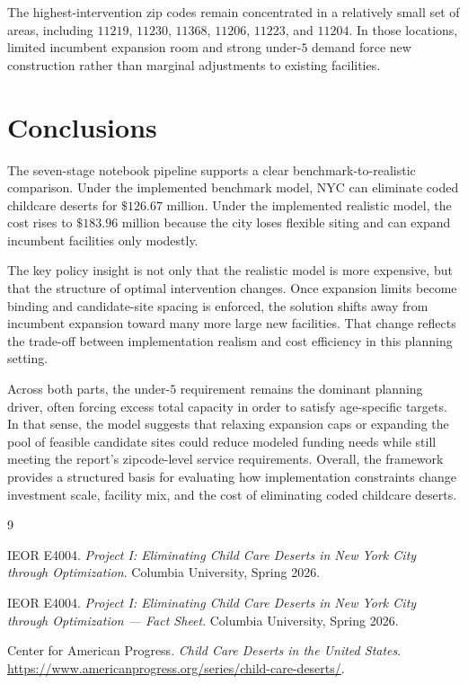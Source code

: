 \documentclass[11pt]{article}
\begin{document}
The highest-intervention zip codes remain concentrated in a relatively small set of areas, including \(11219\), \(11230\), \(11368\), \(11206\), \(11223\), and \(11204\). In those locations, limited incumbent expansion room and strong under-\(5\) demand force new construction rather than marginal adjustments to existing facilities.

\section{Conclusions}

The seven-stage notebook pipeline supports a clear benchmark-to-realistic comparison. Under the implemented benchmark model, NYC can eliminate coded childcare deserts for \(\$126.67\) million. Under the implemented realistic model, the cost rises to \(\$183.96\) million because the city loses flexible siting and can expand incumbent facilities only modestly.

The key policy insight is not only that the realistic model is more expensive, but that the structure of optimal intervention changes. Once expansion limits become binding and candidate-site spacing is enforced, the solution shifts away from incumbent expansion toward many more large new facilities. That change reflects the trade-off between implementation realism and cost efficiency in this planning setting.

Across both parts, the under-\(5\) requirement remains the dominant planning driver, often forcing excess total capacity in order to satisfy age-specific targets. In that sense, the model suggests that relaxing expansion caps or expanding the pool of feasible candidate sites could reduce modeled funding needs while still meeting the report's zipcode-level service requirements. Overall, the framework provides a structured basis for evaluating how implementation constraints change investment scale, facility mix, and the cost of eliminating coded childcare deserts.

\begin{thebibliography}{9}

IEOR E4004.
\emph{Project I: Eliminating Child Care Deserts in New York City through Optimization}.
Columbia University, Spring 2026.

IEOR E4004.
\emph{Project I: Eliminating Child Care Deserts in New York City through Optimization --- Fact Sheet}.
Columbia University, Spring 2026.

Center for American Progress.
\emph{Child Care Deserts in the United States}.
\url{https://www.americanprogress.org/series/child-care-deserts/}.

\end{thebibliography}
\end{document}
